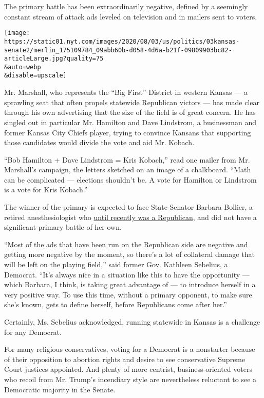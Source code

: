 The primary battle has been extraordinarily negative, defined by a
seemingly constant stream of attack ads leveled on television and in
mailers sent to voters.

\texttt{[image: https://static01.nyt.com/images/2020/08/03/us/politics/03kansas-senate2/merlin\_175109784\_09abb60b-d058-4d6a-b21f-09809903bc82-articleLarge.jpg?quality=75\\\&auto=webp\\\&disable=upscale]}

Mr. Marshall, who represents the ``Big First'' District in western
Kansas --- a sprawling seat that often propels statewide Republican
victors --- has made clear through his own advertising that the size of
the field is of great concern. He has singled out in particular Mr.
Hamilton and Dave Lindstrom, a businessman and former Kansas City Chiefs
player, trying to convince Kansans that supporting those candidates
would divide the vote and aid Mr. Kobach.

``Bob Hamilton + Dave Lindstrom = Kris Kobach,'' read one mailer from
Mr. Marshall's campaign, the letters sketched on an image of a
chalkboard. ``Math can be complicated --- elections shouldn't be. A vote
for Hamilton or Lindstrom is a vote for Kris Kobach.''

The winner of the primary is expected to face State Senator Barbara
Bollier, a retired anesthesiologist who
\href{https://www.kansas.com/news/politics-government/article222990385.html}{until
recently was a Republican}, and did not have a significant primary
battle of her own.

``Most of the ads that have been run on the Republican side are negative
and getting more negative by the moment, so there's a lot of collateral
damage that will be left on the playing field,'' said former Gov.
Kathleen Sebelius, a Democrat. ``It's always nice in a situation like
this to have the opportunity --- which Barbara, I think, is taking great
advantage of --- to introduce herself in a very positive way. To use
this time, without a primary opponent, to make sure she's known, gets to
define herself, before Republicans come after her.''

Certainly, Ms. Sebelius acknowledged, running statewide in Kansas is a
challenge for any Democrat.

For many religious conservatives, voting for a Democrat is a nonstarter
because of their opposition to abortion rights and desire to see
conservative Supreme Court justices appointed. And plenty of more
centrist, business-oriented voters who recoil from Mr. Trump's
incendiary style are nevertheless reluctant to see a Democratic majority
in the Senate.

